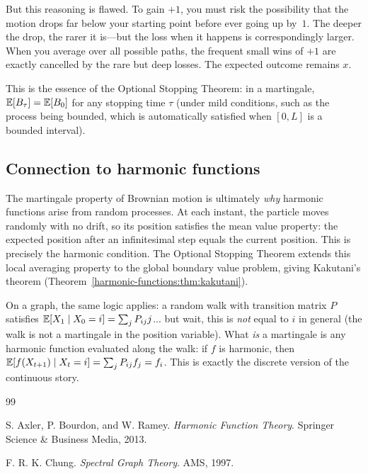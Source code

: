 \begin{notechapter}
But this reasoning is flawed. To gain $+1$, you must risk the possibility
that the motion drops far below your starting point before ever going up
by~$1$. The deeper the drop, the rarer it is---but the loss when it happens
is correspondingly larger. When you average over all possible paths, the
frequent small wins of $+1$ are exactly cancelled by the rare but deep
losses. The expected outcome remains $x$.

This is the essence of the Optional Stopping Theorem: in a martingale,
$\mathbb{E}[B_\tau] = \mathbb{E}[B_0]$ for any stopping time $\tau$ (under mild
conditions, such as the process being bounded, which is automatically
satisfied when $[0, L]$ is a bounded interval).

\subsection*{Connection to harmonic functions}

The martingale property of Brownian motion is ultimately \emph{why}
harmonic functions arise from random processes. At each instant, the
particle moves randomly with no drift, so its position satisfies the mean
value property: the expected position after an infinitesimal step equals the
current position. This is precisely the harmonic condition. The Optional
Stopping Theorem extends this local averaging property to the global
boundary value problem, giving Kakutani's theorem
(Theorem~\ref{harmonic-functions:thm:kakutani}).

On a graph, the same logic applies: a random walk with transition matrix
$P$ satisfies $\mathbb{E}[X_1 \mid X_0 = i] = \sum_j P_{ij} j$... but wait, this
is \emph{not} equal to $i$ in general (the walk is not a martingale in
the position variable). What \emph{is} a martingale is any harmonic function
evaluated along the walk: if $f$ is harmonic, then
$\mathbb{E}[f(X_{t+1}) \mid X_t = i] = \sum_j P_{ij}f_j = f_i$. This is exactly
the discrete version of the continuous story.


\newpage
\begin{thebibliography}{99}

S. Axler, P. Bourdon, and W. Ramey.
\textit{Harmonic Function Theory}.
Springer Science \& Business Media, 2013.

F. R. K. Chung.
\textit{Spectral Graph Theory}.
AMS, 1997.


\end{thebibliography}
\end{notechapter}
